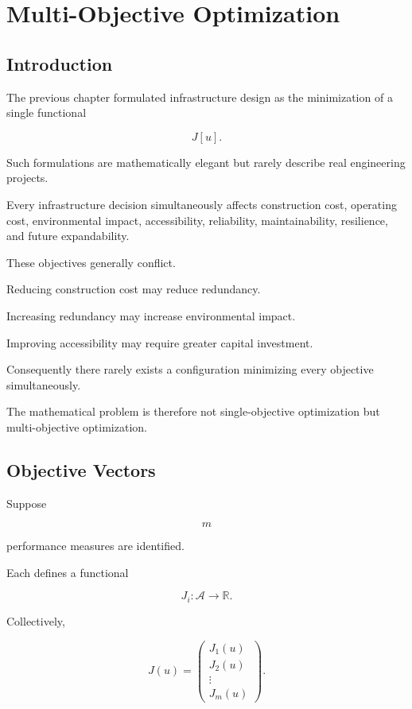 \documentclass[11pt,fleqn]{book}
\numberwithin{equation}{chapter}
\theoremstyle{plain}
\theoremstyle{definition}
\theoremstyle{remark}
\begin{document}
\chapter{Multi-Objective Optimization}
\label{chap:multi-objective-optimization}

\section{Introduction}

The previous chapter formulated infrastructure design as the
minimization of a single functional

\[
J[u].
\]

Such formulations are mathematically elegant but rarely describe real
engineering projects.

Every infrastructure decision simultaneously affects construction cost,
operating cost, environmental impact, accessibility, reliability,
maintainability, resilience, and future expandability.

These objectives generally conflict.

Reducing construction cost may reduce redundancy.

Increasing redundancy may increase environmental impact.

Improving accessibility may require greater capital investment.

Consequently there rarely exists a configuration minimizing every
objective simultaneously.

The mathematical problem is therefore not single-objective
optimization but multi-objective optimization.


\section{Objective Vectors}

Suppose

\[
m
\]

performance measures are identified.

Each defines a functional

\[
J_i:\mathcal A\rightarrow\mathbb R.
\]

Collectively,

\[
J(u)
=
\begin{pmatrix}
J_1(u)\\
J_2(u)\\
\vdots\\
J_m(u)
\end{pmatrix}.
\]
\end{document}
